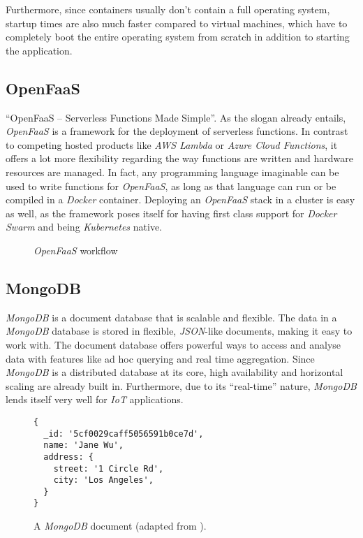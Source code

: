 Furthermore, since containers usually don't contain a full operating system, startup times are also
much faster compared to virtual machines, which have to completely boot the entire operating system
from scratch in addition to starting the application. \cite{docker-container}

\subsection{OpenFaaS}

“OpenFaaS – Serverless Functions Made Simple”. As the slogan already entails, \textit{OpenFaaS} is a
framework for the deployment of serverless functions. In contrast to competing hosted products like
\textit{AWS Lambda} or \textit{Azure Cloud Functions}, it offers a lot more flexibility regarding
the way functions are written and hardware resources are managed. In fact, any programming language
imaginable can be used to write functions for \textit{OpenFaaS}, as long as that language can run or
be compiled in a \textit{Docker} container. Deploying an \textit{OpenFaaS} stack in a cluster is
easy as well, as the framework poses itself for having first class support for \textit{Docker Swarm}
and being \textit{Kubernetes} native. \cite{openfaas-docs}

\begin{figure}[H]
  \centering
  \caption{\textit{OpenFaaS} workflow \cite{openfaas-docs}}
\end{figure}

\subsection{MongoDB}

\textit{MongoDB} is a document database that is scalable and flexible. The data in a
 \textit{MongoDB} database is stored in flexible, \textit{JSON}-like documents, making it easy to
 work with. The document database offers powerful ways to access and analyse data with features like
 ad hoc querying and real time aggregation. Since \textit{MongoDB} is a distributed database at its
 core, high availability and horizontal scaling are already built in. Furthermore, due to its
 “real-time” nature, \textit{MongoDB} lends itself very well for \textit{IoT} applications.
 \cite{mongodb-description}

 \begin{figure}[H]
  \centering
  \begin{lstlisting}[basicstyle=\small]
{
  _id: '5cf0029caff5056591b0ce7d',
  name: 'Jane Wu',
  address: {
    street: '1 Circle Rd',
    city: 'Los Angeles',
  }
}
  \end{lstlisting}
  \caption{A \textit{MongoDB} document (adapted from \cite{mongodb-description}).}
\end{figure}

